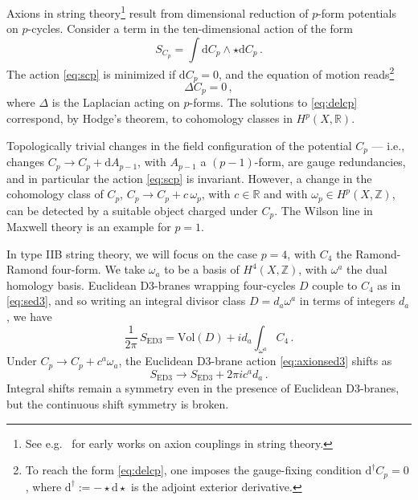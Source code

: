 \documentclass[12pt,a4wide]{article}
\def\d{\mathrm{d}}
\begin{document}
Axions in string theory\footnote{See e.g.~\cite{Choi:1997an,Banks:2003sx,Conlon:2006tq,Svrcek:2006yi} for early works on axion couplings in string theory.} result from dimensional reduction of $p$-form potentials on $p$-cycles.  Consider a term in the ten-dimensional action of the form
\begin{equation}\label{eq:scp}
S_{C_p} = \int \text{d} C_p \wedge \star \text{d}C_p\,.
\end{equation}
The action \eqref{eq:scp} is minimized if $\d C_p=0$, and the equation of motion reads\footnote{To reach the form \eqref{eq:delcp}, one imposes the gauge-fixing condition $\text{d}^{\dagger}C_p=0$, where $\text{d}^{\dagger}:=- \star \text{d} \star$ is the adjoint exterior derivative.}
\begin{equation}\label{eq:delcp}
\Delta C_p = 0\,,
\end{equation}
where $\Delta$ is the Laplacian acting on $p$-forms.
The solutions to \eqref{eq:delcp} correspond, by Hodge's theorem, to cohomology classes in $H^p(X,\mathbb{R})$.

Topologically trivial changes in the field configuration of the potential $C_p$ --- i.e., changes $C_p \to C_p + \text{d} A_{p-1}$, with $A_{p-1}$ a $(p-1)$-form, are gauge redundancies, and in particular the action \eqref{eq:scp} is invariant.
However, a change in the cohomology class of $C_p$, $C_p \to C_p + c\, \omega_p$, with $c \in \mathbb{R}$ and with $\omega_p \in H^p(X,\mathbb{Z})$,
can be detected by a suitable object charged under $C_p$.  The Wilson line in Maxwell theory is an example for $p=1$.

In type IIB string theory, we will focus on the case $p=4$, with $C_4$ the Ramond-Ramond four-form.  
We take $\omega_a$ to be a basis of $H^4(X,\mathbb{Z})$, with  $\omega^a$ the dual homology basis. 
Euclidean D3-branes wrapping four-cycles $D$ couple to $C_4$ as in \eqref{eq:sed3},
and so writing an integral divisor class $D = d_a \omega^a$ in terms of integers $d_a$, we have
\begin{equation}\label{eq:axionsed3}
\frac{1}{2\pi}\,S_{\text{ED3}} = \text{Vol}(D) + i d_a\int_{\omega^a} C_4\,.
\end{equation}
Under $C_p \to C_p + c^a \omega_a$, the Euclidean D3-brane action \eqref{eq:axionsed3} shifts as
\begin{equation}
S_{\text{ED3}} \to S_{\text{ED3}} + 2\pi i c^a d_a\,.
\end{equation}
Integral shifts remain a symmetry even in the presence of Euclidean D3-branes, but the continuous shift symmetry is broken.
\end{document}
